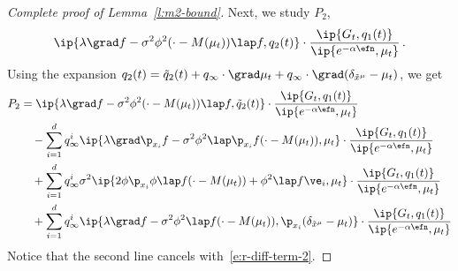 \documentclass{amsart}
\begin{document}
\begin{proof}[Complete proof of Lemma~\ref{l:m2-bound}]
	Next, we study $P_2$, 
	\begin{equation*}
		\ip{\lambda \grad f - \sigma^2 \phi^2 (\cdot-M(\mu_t)) \lap f, q_2(t)} \cdot \frac{\ip{G_t, q_1(t)}}{\ip{e^{-\alpha\efn}, \mu_t}} \,.
	\end{equation*}
	Using the expansion $q_2(t) = \tilde q_2(t) + q_\infty \cdot \grad \mu_t + q_\infty \cdot \grad (\delta_{\tilde x^\mu} - \mu_t)$, we get 
	\begin{align*}
		P_2 & = \ip{\lambda \grad f - \sigma^2 \phi^2 (\cdot-M(\mu_t)) \lap f, \tilde q_2(t)} \cdot \frac{\ip{G_t, q_1(t)}}{\ip{e^{-\alpha\efn}, \mu_t}} \\
		& \quad - \sum_{i=1}^d q_\infty^i \ip{\lambda \grad \p_{x_i} f - \sigma^2 \phi^2 \lap \p_{x_i} f (\cdot-M(\mu_t)), \mu_t } \cdot \frac{\ip{G_t, q_1(t)}}{\ip{e^{-\alpha\efn}, \mu_t}} \\
		& \quad + \sum_{i=1}^d q_\infty^i \sigma^2 \ip{ 2 \phi \p_{x_i} \phi \lap f (\cdot-M(\mu_t)) + \phi^2 \lap f \ve_i, \mu_t } \cdot \frac{\ip{G_t, q_1(t)}}{\ip{e^{-\alpha\efn}, \mu_t}} \\
		& \quad + \sum_{i=1}^d q_\infty^i \ip{\lambda \grad f - \sigma^2 \phi^2 \lap f (\cdot-M(\mu_t)), \p_{x_i} (\delta_{\tilde x^\mu} - \mu_t)} \cdot \frac{\ip{G_t, q_1(t)}}{\ip{e^{-\alpha\efn}, \mu_t}}
	\end{align*}
	Notice that the second line cancels with~\eqref{e:r-diff-term-2}.


\end{proof}
\end{document}
